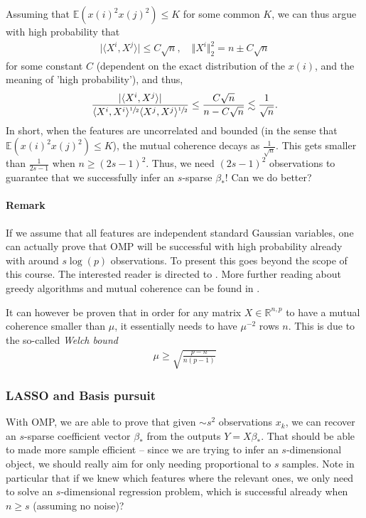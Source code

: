 \documentclass{article}
\newcommand{\sprod}[1]{\langle #1 \rangle}
\newcommand{\R}{\mathbb{R}}
\newcommand{\abs}[1]{\vert #1 \vert}
\newcommand{\norm}[1]{\Vert #1 \Vert}
\newcommand{\leqsim}{\lesssim}
\begin{document}
Assuming that $\mathbb{E}(x(i)^2x(j)^2)\leq K$ for some common $K$, we can thus argue with high probability that
\begin{align}
    \abs{\sprod{X^i,X^j}} \leq C \sqrt{n}, \quad \norm{X^i}_2^2 = n \pm C\sqrt{n}
\end{align}
for some constant $C$ (dependent on the exact distribution of the $x(i)$, and the meaning of 'high probability'), and thus,
\begin{align*}
     \frac{\abs{\sprod{X^i,X^j}}}{\sprod{X^i,X^i}^{\sfrac{1}{2}}\sprod{X^j,X^j}^{\sfrac{1}{2}}} \leq \frac{C\sqrt{n}}{n - C\sqrt{n}} \leqsim \frac{1}{\sqrt{n}}.
\end{align*}
In short, when the features are uncorrelated and bounded (in the sense that $\mathbb{E}(x(i)^2x(j)^2)\leq K$), the mutual coherence decays as $\frac{1}{\sqrt{n}}$. This gets smaller than $\frac{1}{2s-1}$ when $n\geq (2s-1)^2$. Thus, we need $(2s-1)^2$ observations to guarantee that we successfully infer an $s$-sparse $\beta_*$! Can we do better?

\paragraph{Remark} If we assume that all features are independent standard Gaussian variables, one can actually prove that OMP will be successful with high probability already with around $s\log(p)$ observations. To present this goes beyond the scope of this course. The interested reader is directed to \cite{tropp2007signal}. More further reading about greedy algorithms and mutual coherence can be found in \cite[Ch.3,5]{FouRau2013}.

It can however be proven that in order for any matrix $X\in \R^{n,p}$ to have a mutual coherence smaller than $\mu$, it essentially needs to have $\mu^{-2}$ rows $n$. This is due to the so-called \emph{Welch bound} \cite{WelchBound}
\begin{align*}
    \mu \geq \sqrt{\frac{p-n}{n(p-1)}}
\end{align*}

\subsubsection{LASSO and Basis pursuit}
With OMP, we are able to prove that given $\sim s^2$ observations $x_k$, we can recover an $s$-sparse coefficient vector $\beta_*$ from the outputs $Y = X\beta_*$. That should be able to made more sample efficient -- since we are trying to infer an $s$-dimensional object, we should really aim for only needing proportional to $s$ samples. Note in particular that if we knew which features where the relevant ones, we only need to solve an $s$-dimensional regression problem, which is successful already when $n\geq s$ (assuming no noise)?
\end{document}
